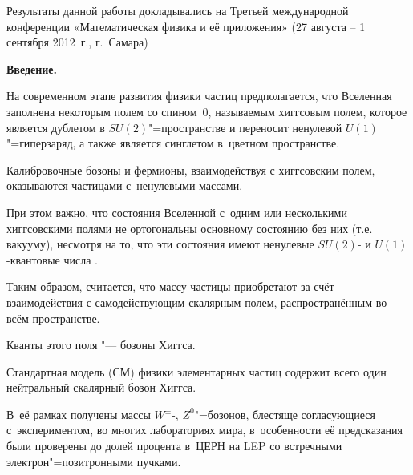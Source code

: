 


\date{01/II/2013} %









\maketitle



{\small \noindent Результаты данной работы докладывались на Третьей международной конференции «Математическая физика и её приложения» (27 августа -- 1 сентября 2012~г., г.~Самара)}



\bigskip





\textbf{Введение.}

На современном этапе развития физики частиц предполагается, что Вселенная заполнена некоторым полем со спином~0, называемым хиггсовым полем, которое является дублетом в $SU(2)$"=пространстве и переносит ненулевой $U(1)$"=гиперзаряд, а также является синглетом в~цветном пространстве. 

Калибровочные бозоны и фермионы, взаимодействуя с хиггсовским полем, оказываются частицами с~ненулевыми массами. 

При этом важно, что состояния Вселенной с~одним или несколькими хиггсовскими полями не ортогональны основному состоянию без них (т.е. вакууму), несмотря на то, что эти состояния имеют ненулевые $SU(2)$- и $U(1)$-квантовые числа \cite{kein, pes}. 

Таким образом, считается, что массу частицы приобретают за счёт взаимодействия с самодействующим скалярным полем, распространённым во всём пространстве. 

Кванты этого поля "--- бозоны Хиггса.



Стандартная модель (СМ) физики элементарных частиц содержит всего один нейтральный скалярный бозон Хиггса. 

В~её рамках получены массы $W^{\pm }$-, $ Z^{0}$"=бозонов, блестяще согласующиеся с~экспериментом, во многих лабораториях мира, в~особенности её предсказания были проверены до долей процента в~ЦЕРН на LEP со встречными электрон"=позитронными пучками. 

